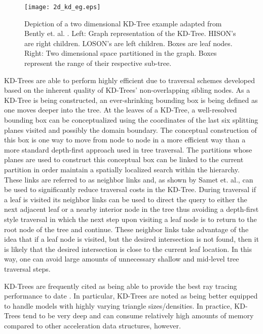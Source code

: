 \begin{figure}[H]
  \centering
  \texttt{[image: 2d\_kd\_eg.eps]}
  \caption{Depiction of a two dimensional KD-Tree example adapted from Bently
    et. al. \cite{Bentley_1975}. Left: Graph representation of the
    KD-Tree. HISON's are right children. LOSON's are left children. Boxes are
    leaf nodes. Right: Two dimensional space partitioned in the graph. Boxes represent
    the range of their respective sub-tree.}
  \label{fig:2D_kd_tree}
\end{figure}

KD-Trees are able to perform highly efficient due to traversal schemes developed
based on the inherent quality of KD-Trees' non-overlapping sibling nodes. As a
KD-Tree is being constructed, an ever-shrinking bounding box is being defined as
one moves deeper into the tree. At the leaves of a KD-Tree, a well-resolved
bounding box can be conceptualized using the coordinates of the last six
splitting planes visited and possibly the domain boundary. The conceptual
construction of this box is one way to move from node to node in a more
efficient way than a more standard depth-first approach used in tree
traversal. The partitions whose planes are used to construct this conceptual box
can be linked to the current partition in order maintain a spatially localized
search within the hierarchy. These links are referred to as neighbor links and,
as shown by Samet et. al.\cite{Samet_1989}, can be used to significantly reduce
traversal costs in the KD-Tree. During traversal if a leaf is visited its
neighbor links can be used to direct the query to either the next adjacent leaf
or a nearby interior node in the tree thus avoiding a depth-first style
traversal in which the next step upon visiting a leaf node is to return to the
root node of the tree and continue. These neighbor links take advantage of the
idea that if a leaf node is visited, but the desired intersection is not found,
then it is likely that the desired intersection is close to the current leaf
location. In this way, one can avoid large amounts of unnecessary shallow and
mid-level tree traversal steps.

KD-Trees are frequently cited as being able to provide the best ray tracing
performance to date \cite{Ernst_2007,Hurley_2002,Havran_2000}. In particular,
KD-Trees are noted as being better equipped to handle models with highly varying
triangle sizes/densities. In practice, KD-Trees tend to be very deep and can
consume relatively high amounts of memory compared to other acceleration data
structures, however. 

